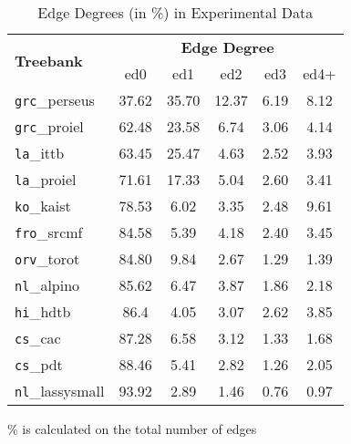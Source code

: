 \begin{table}[H]
    \centering
    \begin{tabular}{|l|c|c|c|c|c|}
    \hline
    \multirow{2}{*}{\textbf{Treebank}} &
    \multicolumn{5}{c|}{\textbf{Edge Degree}} \\
    & ed0 & ed1 & ed2 & ed3 & ed4+\\
    \hline
    \hline
    \texttt{grc}\_perseus & 37.62 & 35.70 & 12.37 & 6.19 & 8.12\\
    \texttt{grc}\_proiel & 62.48 & 23.58 & 6.74 & 3.06 & 4.14\\
    \texttt{la}\_ittb & 63.45 & 25.47 & 4.63 & 2.52 & 3.93\\
    \texttt{la}\_proiel & 71.61 & 17.33 & 5.04 & 2.60 & 3.41\\
    \texttt{ko}\_kaist & 78.53 & 6.02 & 3.35 & 2.48 & 9.61\\
    \texttt{fro}\_srcmf & 84.58 & 5.39 & 4.18 & 2.40 & 3.45\\
    \texttt{orv}\_torot & 84.80 & 9.84 & 2.67 & 1.29 & 1.39\\
    \texttt{nl}\_alpino & 85.62 & 6.47 & 3.87 & 1.86 & 2.18\\
    \texttt{hi}\_hdtb & 86.4 & 4.05 & 3.07 & 2.62 & 3.85\\
    \texttt{cs}\_cac & 87.28 & 6.58 & 3.12 & 1.33 & 1.68\\
    \hline
    \texttt{cs}\_pdt & 88.46 & 5.41 & 2.82 & 1.26 & 2.05\\
    \texttt{nl}\_lassysmall & 93.92 & 2.89 & 1.46 & 0.76 & 0.97\\
    \hline
    \end{tabular}
    \caption{Edge Degrees (in \%) in Experimental Data}\% is calculated on the total number of edges
    \label{tab:edge_degrees}
\end{table}


